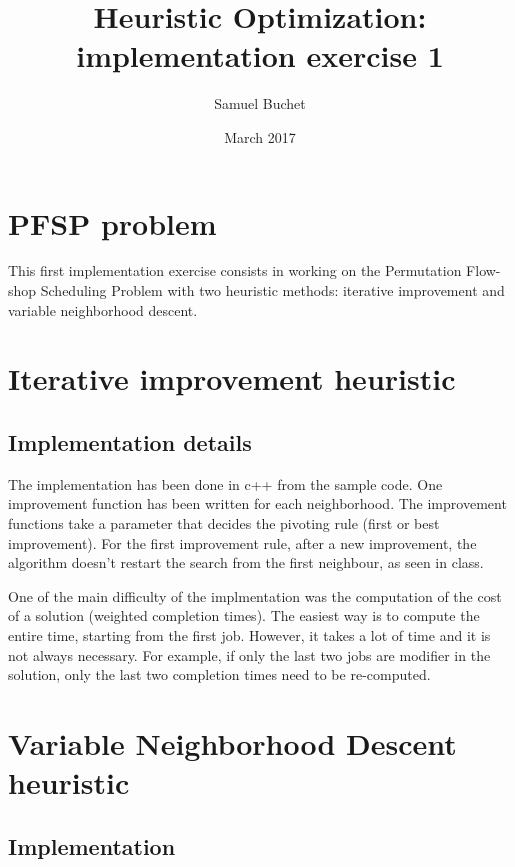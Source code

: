 \documentclass{article}
\title{Heuristic Optimization: implementation exercise 1}
\author{Samuel Buchet}
\date{March 2017}
\begin{document}
\maketitle

\section{PFSP problem}

This first implementation exercise consists in working on the Permutation Flow-shop Scheduling Problem with two heuristic methods: iterative improvement and variable neighborhood descent.

\section{Iterative improvement heuristic}

\subsection{Implementation details}

The implementation has been done in c++ from the sample code.
One improvement function has been written for each neighborhood.
The improvement functions take a parameter that decides the pivoting rule (first or best improvement).
For the first improvement rule, after a new improvement, the algorithm doesn't restart the search from the first neighbour, as seen in class. \newline

One of the main difficulty of the implmentation was the computation of the cost of a solution (weighted completion times). The easiest way is to compute the entire time, starting from the first job. However, it takes a lot of time and it is not always necessary. For example, if only the last two jobs are modifier in the solution, only the last two completion times need to be re-computed.  

\section{Variable Neighborhood Descent heuristic}

\subsection{Implementation}
\end{document}
